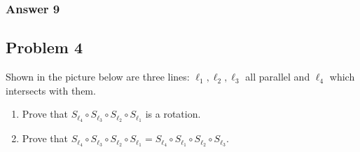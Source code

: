 \documentclass[11pt]{article}
\begin{document}
\subsubsection{Answer 9}
\label{sec-1-3-3}
\subsection{Problem 4}
\label{sec-1-4}
Shown in the picture below are three lines: $\ell_1, \ell_2, \ell_3$
all parallel and $\ell_4$ which intersects with them.


\begin{enumerate}
\item Prove that $S_{\ell_4} \circ S_{\ell_3} \circ S_{\ell_2} \circ S_{\ell_1}$
is a rotation.
\item Prove that $S_{\ell_4} \circ S_{\ell_3} \circ S_{\ell_2} \circ S_{\ell_1}=
      S_{\ell_4} \circ S_{\ell_1} \circ S_{\ell_2} \circ S_{\ell_3}$.
\end{enumerate}
\end{document}
